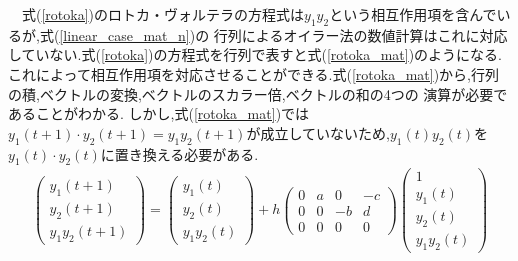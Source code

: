 \documentclass[a4j]{jarticle}
\begin{document}
  　式(\ref{rotoka})のロトカ・ヴォルテラの方程式は$y_1y_2$という相互作用項を含んでいるが,式(\ref{linear_case_mat_n})の
  行列によるオイラー法の数値計算はこれに対応していない.式(\ref{rotoka})の方程式を行列で表すと式(\ref{rotoka_mat})のようになる.
  これによって相互作用項を対応させることができる.式(\ref{rotoka_mat})から,行列の積,ベクトルの変換,ベクトルのスカラー倍,ベクトルの和の4つの
  演算が必要であることがわかる.
  しかし,式(\ref{rotoka_mat})では$y_1(t+1)\cdot y_2(t+1) =  y_1y_2(t+1)$が成立していないため,$y_1(t)y_2(t)$を$y_1(t)\cdot y_2(t)$に置き換える必要がある.
  \begin{eqnarray}
    \left(
      \begin{array}{c}
        y_1(t+1)  \\
        y_2(t+1)  \\
        y_1y_2(t+1) 
      \end{array}
    \right)
  =
    \left(
      \begin{array}{ccc}
        y_1(t) \\
        y_2(t) \\
        y_1y_2(t)
      \end{array}
    \right)
    +
    h\left(
      \begin{array}{cccc}
        0 & a & 0 & -c \\
        0 & 0 & -b & d \\
        0 & 0 & 0 & 0
      \end{array}
    \right)
    \left(
      \begin{array}{ccc}
        1 \\
        y_1(t) \\
        y_2(t) \\
        y_1y_2(t)
      \end{array}
    \right)
  \label{rotoka_mat}
\end{eqnarray}
\end{document}
